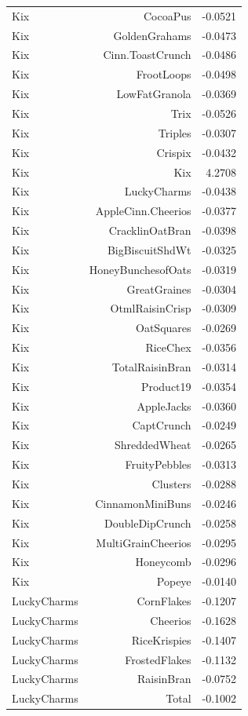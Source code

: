 \begin{longtable}{@{}lrr@{}}
Kix & CocoaPus & -0.0521 \\
Kix & GoldenGrahams & -0.0473 \\
Kix & Cinn.ToastCrunch & -0.0486 \\
Kix & FrootLoops & -0.0498 \\
Kix & LowFatGranola & -0.0369 \\
Kix & Trix & -0.0526 \\
Kix & Triples & -0.0307 \\
Kix & Crispix & -0.0432 \\
Kix & Kix & 4.2708 \\
Kix & LuckyCharms & -0.0438 \\
Kix & AppleCinn.Cheerios & -0.0377 \\
Kix & CracklinOatBran & -0.0398 \\
Kix & BigBiscuitShdWt & -0.0325 \\
Kix & HoneyBunchesofOats & -0.0319 \\
Kix & GreatGraines & -0.0304 \\
Kix & OtmlRaisinCrisp & -0.0309 \\
Kix & OatSquares & -0.0269 \\
Kix & RiceChex & -0.0356 \\
Kix & TotalRaisinBran & -0.0314 \\
Kix & Product19 & -0.0354 \\
Kix & AppleJacks & -0.0360 \\
Kix & CaptCrunch & -0.0249 \\
Kix & ShreddedWheat & -0.0265 \\
Kix & FruityPebbles & -0.0313 \\
Kix & Clusters & -0.0288 \\
Kix & CinnamonMiniBuns & -0.0246 \\
Kix & DoubleDipCrunch & -0.0258 \\
Kix & MultiGrainCheerios & -0.0295 \\
Kix & Honeycomb & -0.0296 \\
Kix & Popeye & -0.0140 \\
LuckyCharms & CornFlakes & -0.1207 \\
LuckyCharms & Cheerios & -0.1628 \\
LuckyCharms & RiceKrispies & -0.1407 \\
LuckyCharms & FrostedFlakes & -0.1132 \\
LuckyCharms & RaisinBran & -0.0752 \\
LuckyCharms & Total & -0.1002 \\

\end{longtable}
